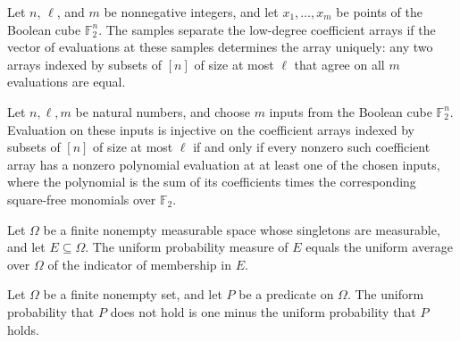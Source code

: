 \begin{definition}
\leanok
{}
Let $n$, $\ell$, and $m$ be nonnegative integers, and let $x_1,\dots,x_m$ be points of
the Boolean cube $\mathbb F_2^n$. The samples separate the low-degree coefficient arrays
if the vector of evaluations at these samples determines the array uniquely: any two
arrays indexed by subsets of $[n]$ of size at most $\ell$ that agree on all $m$
evaluations are equal.
\end{definition}

\begin{theorem}
\leanok
{}
Let $n,\ell,m$ be natural numbers, and choose $m$ inputs from the Boolean cube $\mathbb
F_2^n$. Evaluation on these inputs is injective on the coefficient arrays indexed by
subsets of $[n]$ of size at most $\ell$ if and only if every nonzero such coefficient
array has a nonzero polynomial evaluation at at least one of the chosen inputs, where
the polynomial is the sum of its coefficients times the corresponding square-free
monomials over $\mathbb F_2$.
\end{theorem}

\begin{theorem}
\label{FABL.measure_uniformPMF_event_eq_uniformProbability}
\leanok
{}
Let $\Omega$ be a finite nonempty measurable space whose singletons are measurable, and
let $E\subseteq\Omega$. The uniform probability measure of $E$ equals the uniform
average over $\Omega$ of the indicator of membership in $E$.
\end{theorem}

\begin{theorem}
\label{FABL.uniformProbability_not}
\leanok
{}
Let $\Omega$ be a finite nonempty set, and let $P$ be a predicate on $\Omega$. The
uniform probability that $P$ does not hold is one minus the uniform probability that $P$
holds.
\end{theorem}

